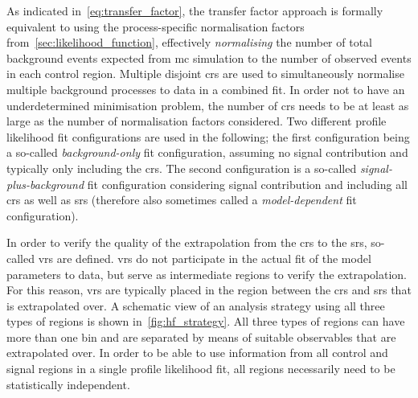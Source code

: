 As indicated in~\cref{eq:transfer_factor}, the transfer factor approach is formally equivalent to using the process-specific normalisation factors from~\cref{sec:likelihood_function}, effectively \textit{normalising} the number of total background events expected from \gls{mc} simulation to the number of observed events in each control region.
Multiple disjoint \glspl{cr} are used to simultaneously normalise multiple background processes to data in a combined fit.
In order not to have an underdetermined minimisation problem, the number of \glspl{cr} needs to be at least as large as the number of normalisation factors considered.
Two different profile likelihood fit configurations are used in the following; the first configuration being a so-called \textit{background-only} fit configuration, assuming no signal contribution and typically only including the \glspl{cr}.
The second configuration is a so-called \textit{signal-plus-background} fit configuration considering signal contribution and including all \glspl{cr} as well as \glspl{sr} (therefore also sometimes called a \textit{model-dependent} fit configuration).

In order to verify the quality of the extrapolation from the \glspl{cr} to the \glspl{sr}, so-called \glspl{vr} are defined. \glspl{vr} do not participate in the actual fit of the model parameters to data, but serve as intermediate regions to verify the extrapolation.
For this reason, \glspl{vr} are typically placed in the region between the \glspl{cr} and \glspl{sr} that is extrapolated over.
A schematic view of an analysis strategy using all three types of regions is shown in~\cref{fig:hf_strategy}. All three types of regions can have more than one bin and are separated by means of suitable observables that are extrapolated over.
In order to be able to use information from all control and signal regions in a single profile likelihood fit, all regions necessarily need to be statistically independent.

